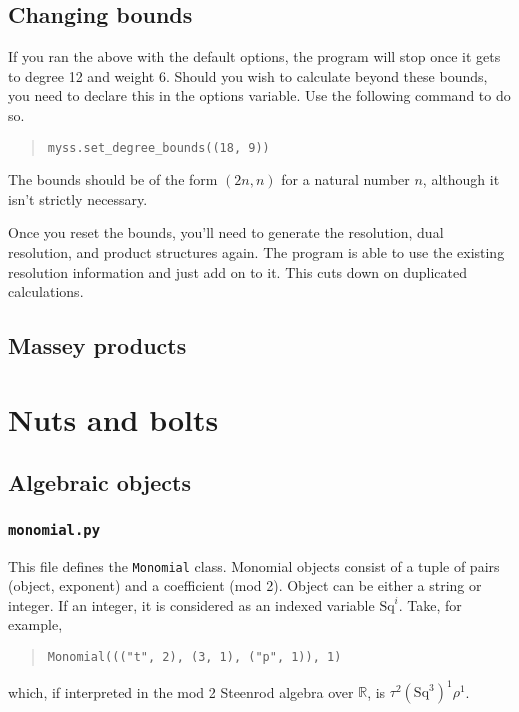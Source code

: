 \documentclass{article}
\begin{document}
\subsection{Changing bounds}

If you ran the above with the default options, the program will stop
once it gets to degree 12 and weight 6. Should you wish to calculate
beyond these bounds, you need to declare this in the options
variable. Use the following command to do so.
\begin{quote}
\begin{verbatim}
myss.set_degree_bounds((18, 9))
\end{verbatim}
\end{quote}
The bounds should be of the form $(2n, n)$ for a natural number $n$,
although it isn't strictly necessary.

Once you reset the bounds, you'll need to generate the resolution,
dual resolution, and product structures again. The program is able to
use the existing resolution information and just add on to it. This
cuts down on duplicated calculations.

\subsection{Massey products}

\section{Nuts and bolts}

\subsection{Algebraic objects}

\subsubsection{\tt monomial.py}
This file defines the \texttt{Monomial} class.  Monomial objects
consist of a tuple of pairs (object, exponent) and a coefficient (mod
2). Object can be either a string or integer. If an integer, it is
considered as an indexed variable $\mathrm{Sq}^i$.  Take, for example,
\begin{quote}
\begin{verbatim}
Monomial((("t", 2), (3, 1), ("p", 1)), 1)
\end{verbatim}
\end{quote}
which, if interpreted in the mod 2 Steenrod algebra over $\mathbb{R}$,
is $\tau^2 (\mathrm{Sq}^3)^1 \rho^1$.
\end{document}
